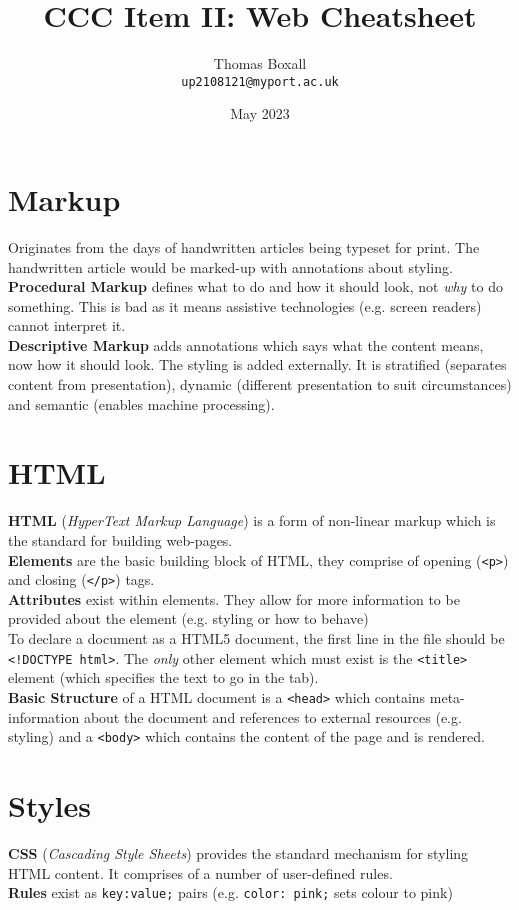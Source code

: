 \documentclass[a4paper,11pt]{article}
\title{CCC Item II: Web Cheatsheet}
\author{Thomas Boxall\\ \texttt{up2108121@myport.ac.uk}}
\date{May 2023}
\begin{document}
\maketitle
\thispagestyle{fancy}

\section{Markup}
Originates from the days of handwritten articles being typeset for print. The handwritten article would be marked-up with annotations about styling.\\
\textbf{Procedural Markup} defines what to do and how it should look, not \textit{why} to do something. This is bad as it means assistive technologies (e.g. screen readers) cannot interpret it.\\
\textbf{Descriptive Markup} adds annotations which says what the content means, now how it should look. The styling is added externally. It is stratified (separates content from presentation), dynamic (different presentation to suit circumstances) and semantic (enables machine processing). 

\section{HTML}
\textbf{HTML} (\textit{HyperText Markup Language}) is a form of non-linear markup which is the standard for building web-pages.\\
\textbf{Elements} are the basic building block of HTML, they comprise of opening (\verb|<p>|) and closing (\verb|</p>|) tags.\\
\textbf{Attributes} exist within elements. They allow for more information to be provided about the element (e.g. styling or how to behave)\\
To declare a document as a HTML5 document, the first line in the file should be \verb|<!DOCTYPE html>|. The \textit{only} other element which must exist is the \verb|<title>| element (which specifies the text to go in the tab).\\
\textbf{Basic Structure} of a HTML document is a \verb|<head>| which contains meta-information about the document and references to external resources (e.g. styling) and a \verb|<body>| which contains the content of the page and is rendered. 

\section{Styles}
\textbf{CSS} (\textit{Cascading Style Sheets}) provides the standard mechanism for styling HTML content. It comprises of a number of user-defined rules.\\
\textbf{Rules} exist as \verb|key:value;| pairs (e.g. \verb|color: pink;| sets colour to pink)
\end{document}
